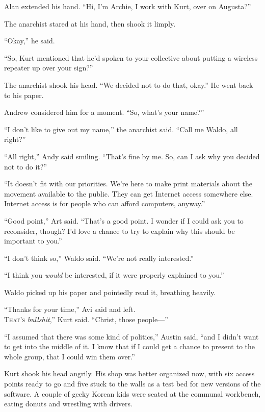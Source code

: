 \documentclass{article}
\begin{document}
Alan extended his hand.  ``Hi, I'm Archie, I work with Kurt, over on
Augusta?''

The anarchist stared at his hand, then shook it limply.

``Okay,'' he said.

``So, Kurt mentioned that he'd spoken to your collective about putting
a wireless repeater up over your sign?''

The anarchist shook his head.  ``We decided not to do that, okay.'' He
went back to his paper.

Andrew considered him for a moment.  ``So, what's your name?''

``I don't like to give out my name,'' the anarchist said.  ``Call me
Waldo, all right?''

``All right,'' Andy said smiling.  ``That's fine by me.  So, can I ask
why you decided not to do it?''

``It doesn't fit with our priorities.  We're here to make print
materials about the movement available to the public.  They can get
Internet access somewhere else.  Internet access is for people who can
afford computers, anyway.''

``Good point,'' Art said.  ``That's a good point.  I wonder if I could
ask you to reconsider, though?  I'd love a chance to try to explain
why this should be important to you.''

``I don't think so,'' Waldo said.  ``We're not really interested.''

``I think you \textit{would} be interested, if it were properly
explained to you.''

Waldo picked up his paper and pointedly read it, breathing heavily.

``Thanks for your time,'' Avi said and left.
\\
\lettrine[lines=3, lhang=.5, nindent=0pt, findent=2pt]{T}{hat's}
\textit{bullshit},'' Kurt said.  ``Christ, those people---''

``I assumed that there was some kind of politics,'' Austin said, ``and
I didn't want to get into the middle of it.  I know that if I could
get a chance to present to the whole group, that I could win them
over.''

Kurt shook his head angrily.  His shop was better organized now, with
six access points ready to go and five stuck to the walls as a test
bed for new versions of the software.  A couple of geeky Korean kids
were seated at the communal workbench, eating donuts and wrestling
with drivers.
\end{document}
